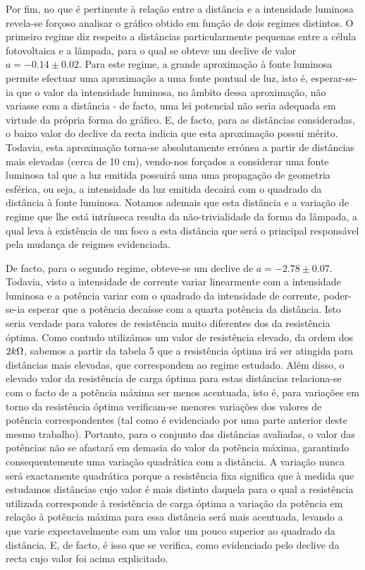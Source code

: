 \documentclass[10pt]{extarticle}
\begin{document}
\begin{multicols}{2}
\par Por fim, no que é pertinente à relação entre a distância e a intensidade luminosa revela-se forçoso analisar o gráfico obtido em função de dois regimes distintos. O primeiro regime diz respeito a distâncias particularmente pequenas entre a célula fotovoltaica e a lâmpada, para o qual se obteve um declive de valor $a=-0.14\pm0.02$. Para este regime, a grande aproximação à fonte luminosa permite efectuar uma aproximação a uma fonte pontual de luz, isto é, esperar-se-ia que o valor da intensidade luminosa, no âmbito dessa aproximação, não variasse com a distância - de facto, uma lei potencial não seria adequada em virtude da própria forma do gráfico. E, de facto, para as distâncias consideradas, o baixo valor do declive da recta indicia que esta aproximação possui mérito. Todavia, esta aproximação torna-se absolutamente errónea a partir de distâncias mais elevadas (cerca de 10 cm), vendo-nos forçados a considerar uma fonte luminosa tal que a luz emitida possuirá uma uma propagação de geometria esférica, ou seja, a intensidade da luz emitida decairá com o quadrado da distância à fonte luminosa. Notamos ademais que esta distância e a variação de regime que lhe está intrínseca resulta da não-trivialidade da forma da lâmpada, a qual leva à existência de um foco a esta distância que será o principal responsável pela mudança de reigmes evidenciada.

\par De facto, para o segundo regime, obteve-se um declive de $a=-2.78\pm0.07$. Todavia, visto a intensidade de corrente variar linearmente com a intensidade luminosa e a potência variar com o quadrado da intensidade de corrente, poder-se-ia esperar que a potência decaísse com a quarta potência da distância. Isto seria verdade para valores de resistência muito diferentes dos da resistência óptima. Como contudo utilizámos um valor de resistência elevado, da ordem dos $2k\ohm$, sabemos a partir da tabela 5 que a resistência óptima irá ser atingida para distâncias mais elevadas, que correspondem ao regime estudado. Além disso, o elevado valor da resistência de carga óptima para estas distâncias relaciona-se com o facto de a potência máxima ser menos acentuada, isto é, para variações em torno da resistência óptima verificam-se menores variações dos valores de potência correspondentes (tal como é evidenciado por uma parte anterior deste mesmo trabalho). Portanto, para o conjunto das distâncias avaliadas, o valor das potências não se afastará em demasia do valor da potência máxima, garantindo consequentemente uma variação quadrática com a distância. A variação nunca será exactamente quadrática porque a resistência fixa significa que à medida que estudamos distâncias cujo valor é mais distinto daquela para o qual a resistência utilizada corresponde à resistência de carga óptima a variação da potência em relação à potência máxima para essa distância será mais acentuada, levando a que varie expectavelmente com um valor um pouco superior ao quadrado da distância. E, de facto, é isso que se verifica, como evidenciado pelo declive da recta cujo valor foi acima explicitado.


\end{multicols}
\end{document}
